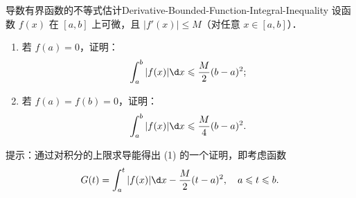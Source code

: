 \begin{problem}{导数有界函数的不等式估计}{Derivative-Bounded-Function-Integral-Inequality}
    设函数 $f(x)$ 在 $[a, b]$ 上可微，且 $|f'(x)| \leqslant M$（对任意 $x \in [a, b]$）．
    \begin{enumerate}
        \item 若 $f(a) = 0$，证明：
              \begin{equation}
                  \int_a^b |f(x)| \d x \leqslant \frac{M}{2}(b - a)^2;
              \end{equation}
        \item 若 $f(a) = f(b) = 0$，证明：
              \begin{equation}
                  \int_a^b |f(x)| \d x \leqslant \frac{M}{4}(b - a)^2.
              \end{equation}
    \end{enumerate}
    提示：通过对积分的上限求导能得出 (1) 的一个证明，即考虑函数
    \begin{equation}
        G(t) = \int_a^t |f(x)| \d x - \frac{M}{2}(t - a)^2, \quad a \leqslant t \leqslant b.
    \end{equation}
\end{problem}

